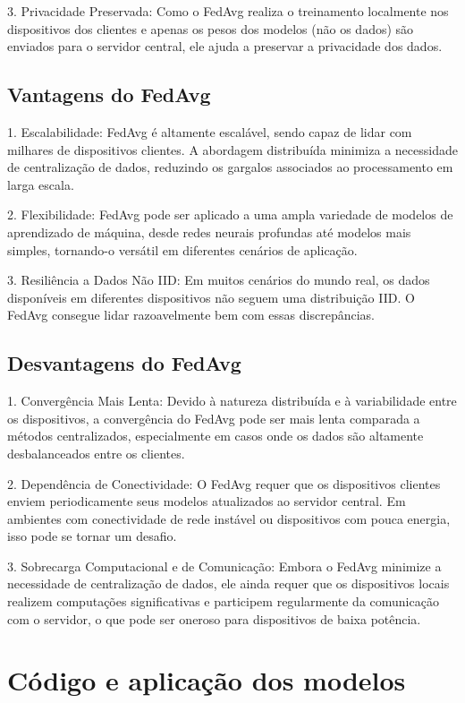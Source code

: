 3. Privacidade Preservada: Como o FedAvg realiza o treinamento localmente nos dispositivos dos clientes e apenas os pesos dos modelos (não os dados) são enviados para o servidor central, ele ajuda a preservar a privacidade dos dados.

\subsection{Vantagens do FedAvg}

1. Escalabilidade: FedAvg é altamente escalável, sendo capaz de lidar com milhares de dispositivos clientes. A abordagem distribuída minimiza a necessidade de centralização de dados, reduzindo os gargalos associados ao processamento em larga escala.

2. Flexibilidade: FedAvg pode ser aplicado a uma ampla variedade de modelos de aprendizado de máquina, desde redes neurais profundas até modelos mais simples, tornando-o versátil em diferentes cenários de aplicação.

3. Resiliência a Dados Não IID: Em muitos cenários do mundo real, os dados disponíveis em diferentes dispositivos não seguem uma distribuição IID. O FedAvg consegue lidar razoavelmente bem com essas discrepâncias.

\subsection{Desvantagens do FedAvg}

1. Convergência Mais Lenta: Devido à natureza distribuída e à variabilidade entre os dispositivos, a convergência do FedAvg pode ser mais lenta comparada a métodos centralizados, especialmente em casos onde os dados são altamente desbalanceados entre os clientes.

2. Dependência de Conectividade: O FedAvg requer que os dispositivos clientes enviem periodicamente seus modelos atualizados ao servidor central. Em ambientes com conectividade de rede instável ou dispositivos com pouca energia, isso pode se tornar um desafio.

3. Sobrecarga Computacional e de Comunicação: Embora o FedAvg minimize a necessidade de centralização de dados, ele ainda requer que os dispositivos locais realizem computações significativas e participem regularmente da comunicação com o servidor, o que pode ser oneroso para dispositivos de baixa potência.

\section{Código e aplicação dos modelos}

